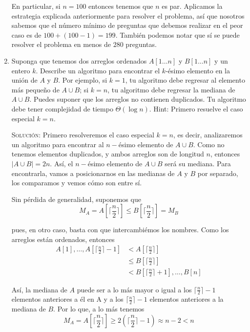 \documentclass[letterpaper,11pt]{article}
\begin{document}
\begin{enumerate}
    En particular, si $n = 100$ entonces tenemos que $n$ es par. Aplicamos 
    la estrategia explicada anteriormente para resolver el problema, así 
    que nosotros sabemos que el número mínimo de preguntas que debemos 
    realizar en el peor caso es de $100 + (100 - 1) = 199$. También podemos 
    notar que sí se puede resolver el problema en menos de $280$ preguntas.

    \item Suponga que tenemos dos arreglos ordenados $A[1 \dots n]$ y 
    $B[1 \dots n]$ y un entero $k$. Describe un algoritmo para encontrar el 
    $k$-ésimo elemento en la unión de $A$ y $B$. Por ejemplo, si $k = 1$, tu 
    algoritmo debe regresar al elemento más pequeño de $A \cup B$; si $k = n$, 
    tu algoritmo debe regresar la mediana de $A \cup B$. Puedes suponer que 
    los arreglos no contienen duplicados. Tu algoritmo debe tener complejidad 
    de tiempo $\Theta(\log n)$. Hint: Primero resuelve el caso especial $k = n$.

    \textsc{Solución:} Primero resolveremos el caso especial $k = n$, es decir, 
    analizaremos un algoritmo para encontrar al $n-$ésimo elemento de $A \cup B$.
    Como no tenemos elementos duplicados, y ambos arreglos son de longitud $n$, 
    entonces $|A \cup B| = 2n$. Así, el $n-$ésimo elemento de $A \cup B$ será 
    su mediana. Para encontrarla, vamos a posicionarnos en las medianas de $A$ 
    y $B$ por separado, los comparamos y vemos cómo son entre sí. 
    
    Sin pérdida de generalidad, suponemos que
    \begin{equation*}
        M_A = A[\lceil \frac{n}{2} \rceil] \leq 
        B[\lceil \frac{n}{2} \rceil] = M_B
    \end{equation*}

    pues, en otro caso, basta con que intercambiémos los nombres. Como los 
    arreglos están ordenados, entonces 
    \begin{align*}
        A[1], \ldots, A[\lceil \frac{n}{2} \rceil - 1]
        &< A[\lceil \frac{n}{2} \rceil] \\
        &\leq B[\lceil \frac{n}{2} \rceil] \\
        &< B[\lceil \frac{n}{2} \rceil + 1], \ldots, B[n]
    \end{align*}

    Así, la mediana de $A$ puede ser a lo más mayor o igual a los 
    $\lceil \frac{n}{2} \rceil - 1$ elementos anteriores a él en A y a los 
    $\lceil \frac{n}{2} \rceil - 1$ elementos anteriores a la mediana de $B$.
    Por lo que, a lo más tenemos
    \begin{equation*}
        M_A = A[\lceil \frac{n}{2} \rceil] \geq 
              2 \left(\lceil \frac{n}{2} \rceil - 1\right) 
            \approx n - 2 < n
    \end{equation*}


\end{enumerate}
\end{document}
